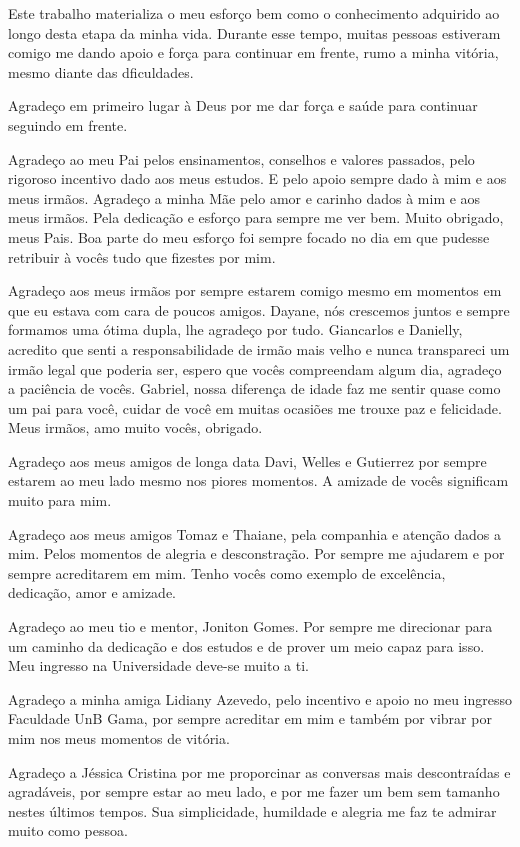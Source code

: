 \begin{agradecimentos}

Este trabalho materializa o meu esforço bem como o conhecimento adquirido ao longo desta etapa da minha vida. Durante esse tempo, muitas pessoas estiveram comigo me dando apoio e força para continuar em frente, rumo a minha vitória, mesmo diante das dficuldades.

Agradeço em primeiro lugar à Deus por me dar força e saúde para continuar seguindo em frente.

Agradeço ao meu Pai pelos ensinamentos, conselhos e valores passados, pelo rigoroso incentivo dado aos meus estudos. E pelo apoio sempre dado à mim e aos meus irmãos. Agradeço a minha Mãe pelo amor e carinho dados à mim e aos meus irmãos. Pela dedicação e esforço para sempre me ver bem. Muito obrigado, meus Pais. Boa parte do meu esforço foi sempre focado no dia em que pudesse retribuir à vocês tudo que fizestes por mim.

Agradeço aos meus irmãos por sempre estarem comigo mesmo em momentos em que eu estava com cara de poucos amigos. Dayane, nós crescemos juntos e sempre formamos uma ótima dupla, lhe agradeço por tudo. Giancarlos e Danielly, acredito que senti a responsabilidade de irmão mais velho e nunca transpareci um irmão legal que poderia ser, espero que vocês compreendam algum dia, agradeço a paciência de vocês. Gabriel, nossa diferença de idade faz me sentir quase como um pai para você, cuidar de você em muitas ocasiões me trouxe paz e felicidade. Meus irmãos, amo muito vocês, obrigado. 

Agradeço aos meus amigos de longa data Davi, Welles e Gutierrez por sempre estarem ao meu lado mesmo nos piores momentos. A amizade de vocês significam muito para mim.

Agradeço aos meus amigos Tomaz e Thaiane, pela companhia e atenção dados a mim. Pelos momentos de alegria e desconstração. Por sempre me ajudarem e por sempre acreditarem em mim. Tenho vocês como exemplo de excelência, dedicação, amor e amizade.

Agradeço ao meu tio e mentor, Joniton Gomes. Por sempre me direcionar para um caminho da dedicação e dos estudos e de prover um meio capaz para isso. Meu ingresso na Universidade deve-se muito a ti.

Agradeço a minha amiga Lidiany Azevedo, pelo incentivo e apoio no meu ingresso Faculdade UnB Gama, por sempre acreditar em mim e também por vibrar por mim nos meus momentos de vitória.

Agradeço a Jéssica Cristina por me proporcinar as conversas mais descontraídas e agradáveis, por sempre estar ao meu lado, e por me fazer um bem sem tamanho nestes últimos tempos. Sua simplicidade, humildade e alegria me faz te admirar muito como pessoa.


\end{agradecimentos}
